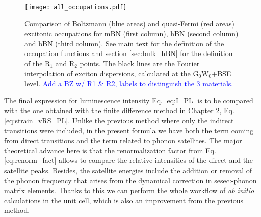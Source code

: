 \begin{figure}[h!b]
	\vspace{0.2cm}
	\setcapindent{2em}
	\centering
	\texttt{[image: all\_occupations.pdf]}
	\caption{Comparison of Boltzmann (blue areas) and quasi-Fermi (red areas) excitonic occupations for \acrshort{mBN} (first column), \acrshort{hBN} (second column) and bBN (third column). See main text for the definition of the occupation functions and section \ref{sec:bulk_hBN} for the definition of the R$_1$ and R$_2$ points. The black lines are the Fourier interpolation of exciton dispersions, calculated at the G$_0$W$_0$+BSE level. \textcolor{blue}{Add a BZ w/ R1 \& R2, labels to distinguish the 3 materials.}}
	\label{fig:all_occup}
\end{figure}

The final expression for luminescence intensity Eq. \eqref{eq:I_PL} is to be compared with the one obtained with the finite difference method in Chapter 2, Eq. \eqref{eq:strain_vRS_PL}. Unlike the previous method where only the indirect transitions were included, in the present formula we have both the term coming from direct transitions and the term related to phonon satellites. The major theoretical advance here is that the renormalization factor from Eq. \eqref{eq:renorm_fact} allows to compare the relative intensities of the direct and the satellite peaks. Besides, the satellite energies include the addition or removal of the phonon frequency that arises from the dynamical correction in sesec:-phonon matrix elements. Thanks to this we can perform the whole workflow of \textit{ab initio} calculations in the unit cell, which is also an improvement from the previous method. 


%
